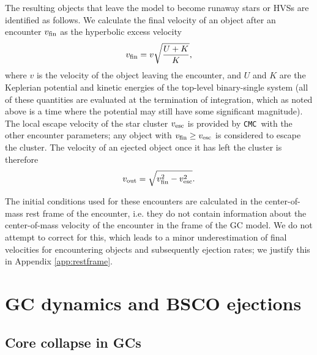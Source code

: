 \documentclass[twocolumn,linenumbers]{aastex631}
\newcommand{\CMC}{\texttt{CMC}}
\begin{document}
The resulting objects that leave the model to become runaway stars or HVSs are identified as follows.
We calculate the final velocity of an object after an encounter $v_{\rm fin}$ as the hyperbolic excess velocity
\begin{equation}
    v_{\rm fin} = v \sqrt{\frac{U + K}{K}},
\end{equation}
\noindent where $v$ is the velocity of the object leaving the encounter, and $U$ and $K$ are the Keplerian potential and kinetic energies of the top-level binary-single system (all of these quantities are evaluated at the termination of integration, which as noted above is a time where the potential may still have some significant magnitude).
The local escape velocity of the star cluster $v_{\rm esc}$ is provided by \CMC\ with the other encounter parameters; any object with $v_{\rm fin} \ge v_{\rm esc}$ is considered to escape the cluster.
The velocity of an ejected object once it has left the cluster is therefore
\begin{equation}
    v_{\rm out} = \sqrt{v_{\rm fin}^2 - v_{\rm esc}^2}.
\end{equation}

The initial conditions used for these encounters are calculated in the center-of-mass rest frame of the encounter, i.e. they do not contain information about the center-of-mass velocity of the encounter in the frame of the GC model.
We do not attempt to correct for this, which leads to a minor underestimation of final velocities for encountering objects and subsequently ejection rates; we justify this in Appendix \ref{app:restframe}.

\section{GC dynamics and BSCO ejections} \label{sec:gcdyns}

\subsection{Core collapse in GCs} \label{subsec:cc}
\end{document}
